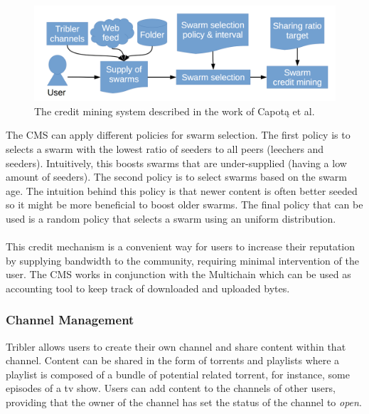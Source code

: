 \begin{figure}[h!]
	\centering
	\includegraphics[width=0.7\columnwidth]{images/architecture/credit_mining}
	\caption{The credit mining system described in the work of Capot\k{a} et al.\cite{capotka2015decentralized}}
	\label{fig:credit-mining}
\end{figure}

The CMS can apply different policies for swarm selection. The first policy is to selects a swarm with the lowest ratio of seeders to all peers (leechers and seeders). Intuitively, this boosts swarms that are under-supplied (having a low amount of seeders). The second policy is to select swarms based on the swarm age. The intuition behind this policy is that newer content is often better seeded so it might be more beneficial to boost older swarms. The final policy that can be used is a random policy that selects a swarm using an uniform distribution.\\\\
This credit mechanism is a convenient way for users to increase their reputation by supplying bandwidth to the community, requiring minimal intervention of the user. The CMS works in conjunction with the Multichain which can be used as accounting tool to keep track of downloaded and uploaded bytes.

\subsubsection{\textbf{Channel Management}}
Tribler allows users to create their own channel and share content within that channel. Content can be shared in the form of torrents and playlists where a playlist is composed of a bundle of potential related torrent, for instance, some episodes of a tv show. Users can add content to the channels of other users, providing that the owner of the channel has set the status of the channel to \emph{open}.

